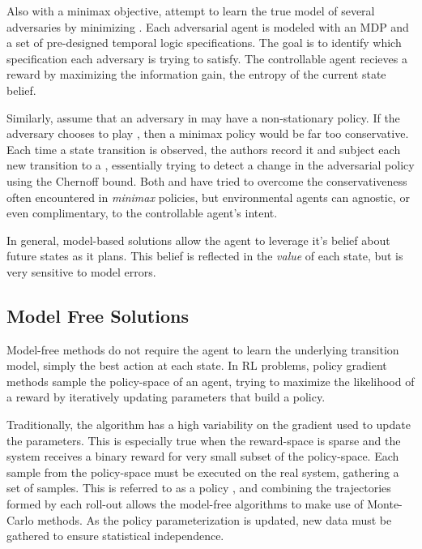     Also with a minimax objective, \cite{chinchali2017multi} attempt to learn the true model of several adversaries by
    minimizing . Each adversarial agent is modeled with an \ac{MDP} and a
    set of pre-designed temporal logic specifications. The goal is to identify which specification each adversary is
    trying to satisfy. The controllable agent recieves a reward by maximizing the information gain, the entropy of the
    current state belief.

    Similarly, \cite{lim2013reinforcement} assume that an adversary in  may have a non-stationary policy. If
    the adversary chooses to play , then a minimax policy would be far too conservative. Each
    time a state transition is observed, the authors record it and subject each new transition to a
    , essentially trying to detect a change in the adversarial policy using the
    Chernoff bound. Both \cite{lim2013reinforcement} and \cite{bertuccelli2012robust} have tried to overcome the
    conservativeness often encountered in \textit{minimax} policies, but environmental agents can agnostic, or even
    complimentary, to the controllable agent's intent.

    In general, model-based solutions allow the agent to leverage it's belief about future states as it plans. This
    belief is reflected in the \textit{value} of each state, but is very sensitive to model errors.

\subsection{Model Free Solutions}
    Model-free methods do not require the agent to learn the underlying transition model, simply the best action at each
    state. In \ac{RL} problems, policy gradient methods sample the policy-space of an agent, trying to maximize the
    likelihood of a reward by iteratively updating parameters that build a policy.

    Traditionally, the \reinforce algorithm \cite{williams1992simple} has a high variability on the gradient used to
    update the parameters. This is especially true when the reward-space is sparse and the system receives a binary
    reward for very small subset of the policy-space. Each sample from the policy-space must be executed on the real
    system, gathering a set of samples. This is referred to as a policy , and combining the trajectories
    formed by each roll-out allows the model-free algorithms to make use of Monte-Carlo methods. As the policy
    parameterization is updated, new data must be gathered to ensure statistical independence.


